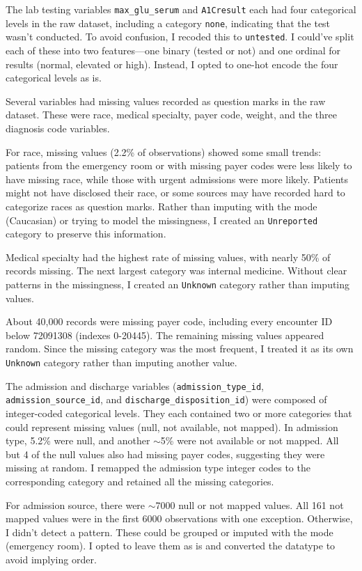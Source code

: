 \documentclass{article}      %
\begin{document}
The lab testing variables \texttt{max\_glu\_serum} and \texttt{A1Cresult} each had four categorical levels in the raw dataset, including a category \texttt{none}, indicating that the test wasn't conducted. To avoid confusion, I recoded this to \texttt{untested}. I could've split each of these into two features---one binary (tested or not) and one ordinal for results (normal, elevated or high). Instead, I opted to one-hot encode the four categorical levels as is. 

Several variables had missing values recorded as question marks in the raw dataset. These were race, medical specialty, payer code, weight, and the three diagnosis code variables.

For race, missing values (2.2\% of observations) showed some small trends: patients from the emergency room or with missing payer codes were less likely to have missing race, while those with urgent admissions were more likely. Patients might not have disclosed their race, or some sources may have recorded hard to categorize races as question marks. Rather than imputing with the mode (Caucasian) or trying to model the missingness, I created an \texttt{Unreported} category to preserve this information.

Medical specialty had the highest rate of missing values, with nearly 50\% of records missing. The next largest category was internal medicine. Without clear patterns in the missingness, I created an \texttt{Unknown} category rather than imputing values.

About 40,000 records were missing payer code, including every encounter ID below 72091308 (indexes 0-20445). The remaining missing values appeared random. Since the missing category was the most frequent, I treated it as its own \texttt{Unknown} category rather than imputing another value.

The admission and discharge variables (\texttt{admission\_type\_id}, \texttt{admission\_source\_id}, and \texttt{discharge\_disposition\_id}) were composed of integer-coded categorical levels. They each contained two or more categories that could represent missing values (null, not available, not mapped). In admission type, 5.2\% were null, and another $\sim$5\% were not available or not mapped. All but 4 of the null values also had missing payer codes, suggesting they were missing at random. I remapped the admission type integer codes to the corresponding category and retained all the missing categories. 

For admission source, there were $\sim$7000 null or not mapped values. All 161 not mapped values were in the first 6000 observations with one exception. Otherwise, I didn't detect a pattern. These could be grouped or imputed with the mode (emergency room). I opted to leave them as is and converted the datatype to avoid implying order.
\end{document}
